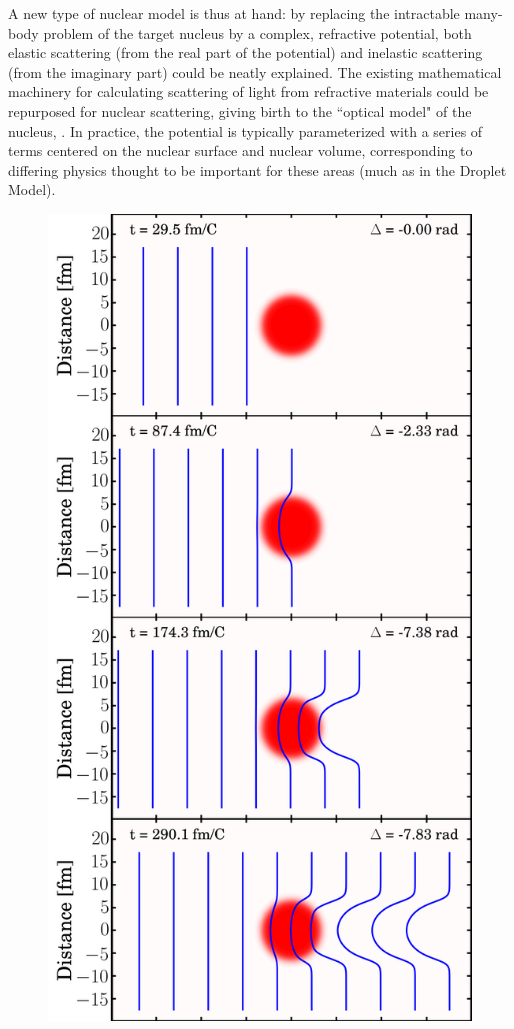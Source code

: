 A new type of nuclear model is thus at hand: by replacing the intractable many-body problem
of the target nucleus by a complex, refractive potential, both elastic scattering (from the real 
part of the potential) and inelastic scattering (from the imaginary part) could be neatly 
explained. The existing mathematical machinery for calculating scattering of light from
refractive materials could be repurposed for nuclear scattering, giving birth to
the ``optical model" of the nucleus, \cite{Feshbach1958, McVoy1967}. In
practice, the potential is typically parameterized with a series of
terms centered on the nuclear surface and nuclear volume,
corresponding to differing physics thought to be important for these areas (much
as in the Droplet Model).

\begin{figure}
    \includegraphics[scale=0.2]{figures/phaseShiftStillsFigure.png}

\end{figure}
